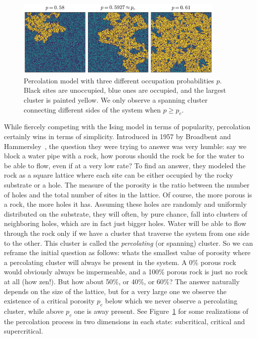 \begin{figure}[b]
\begin{center}
    \includegraphics[width=0.9\textwidth]{chapters/ch2-crit/figs/isoperco}
\end{center}
\caption{Percolation model with three
    different occupation probabilities $p$. Black sites are unoccupied, blue
    ones are occupied, and the largest cluster is painted yellow. 
    We only observe a spanning cluster connecting different sides of the system
    when $p\geq p_c$.}
\label{fig:isoperco}
\end{figure}

While fiercely competing with the Ising model in terms of popularity,
percolation certainly wins in terms of simplicity. Introduced in 1957 by
Broadbent and Hammersley~\cite{Broadbent1957}, the question they were trying to
answer was very humble: say we block a water pipe with a rock, how porous
should the rock be for the water to be able to flow, even if at a very low
rate? To find an answer, they modeled the rock as a square lattice where each
site can be either occupied by the rocky substrate or a hole. The measure of
the porosity is the ratio between the number of holes and the total number of
sites in the lattice. Of course, the more porous is a rock, the more holes it
has. Assuming these holes are randomly and uniformly distributed on the
substrate, they will often, by pure chance, fall into clusters of neighboring
holes, which are in fact just bigger holes. Water will be able to flow through
the rock only if we have a cluster that traverse the system from one side to
the other. This cluster is called the \textit{percolating} (or spanning)
cluster. So we can reframe the initial question as follows: whats the smallest
value of porosity where a percolating cluster will always be present in the
system. A 0\% porous rock would obviously always be impermeable, and a 100\%
porous rock is just no rock at all (how zen!). But how about 50\%, or 40\%, or
60\%? The answer naturally depends on the size of the lattice, but for a very
large one we observe the existence of a critical porosity $p_c$ below which we
never observe a percolating cluster, while above $p_c$ one is away present. See
Figure~\ref{fig:isoperco} for some realizations of the percolation process in
two dimensions in each state: subcritical, critical and supercritical.

